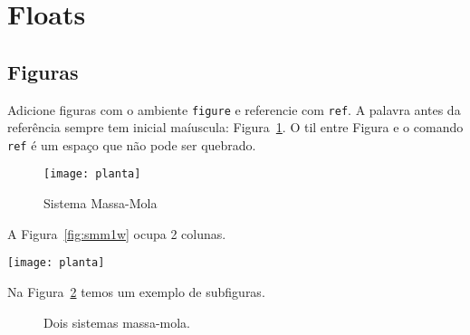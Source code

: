 
\section{Floats}
\subsection{Figuras}

Adicione figuras com o ambiente \texttt{figure} e referencie com \texttt{ref}. A
palavra antes da referência sempre tem inicial maíuscula: Figura~\ref{fig:smm1}.
O til entre Figura e o comando \texttt{ref} é um espaço que não pode ser
quebrado.

\begin{figure}[ht!] %
  \centering %
  \texttt{[image: planta]}
  \caption{Sistema Massa-Mola}%
  \label{fig:smm1}
\end{figure}

A Figura~\ref{fig:smm1w} ocupa 2 colunas.

\begin{figure*}[ht!] %
  \centering %
  \texttt{[image: planta]}
  \caption{Sistema Massa-Mola}%
  \label{fig:smm1w}
\end{figure*}

Na Figura~\ref{fig:smm2} temos um exemplo de subfiguras.

\begin{figure}[ht!]
  \centering
  \qquad
  \caption{Dois sistemas massa-mola.}%
  \label{fig:smm2}
\end{figure}

\FloatBarrier %

